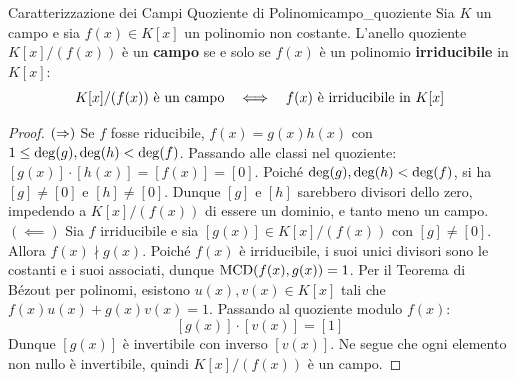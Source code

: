\begin{teorema}{Caratterizzazione dei Campi Quoziente di Polinomi}{campo_quoziente}
Sia $K$ un campo e sia $f(x) \in K[x]$ un polinomio non costante.
L'anello quoziente $K[x]/(f(x))$ è un \textbf{campo} se e solo se $f(x)$ è un polinomio \textbf{irriducibile} in $K[x]$:
\[
    K[x]/(f(x)) \text{ è un campo} \quad \Longleftrightarrow \quad f(x) \text{ è irriducibile in } K[x]
\]
\end{teorema}
\begin{proof}
$(\Rightarrow)$ Se $f$ fosse riducibile, $f(x) = g(x)h(x)$ con $1 \le \operatorname{deg}(g), \operatorname{deg}(h) < \operatorname{deg}(f)$.
Passando alle classi nel quoziente: $[g(x)] \cdot [h(x)] = [f(x)] = [0]$.
Poiché $\operatorname{deg}(g), \operatorname{deg}(h) < \operatorname{deg}(f)$, si ha $[g] \neq [0]$ e $[h] \neq [0]$.
Dunque $[g]$ e $[h]$ sarebbero divisori dello zero, impedendo a $K[x]/(f(x))$ di essere un dominio, e tanto meno un campo.
$(\impliedby)$ Sia $f$ irriducibile e sia $[g(x)] \in K[x]/(f(x))$ con $[g] \neq [0]$.
Allora $f(x) \nmid g(x)$. Poiché $f(x)$ è irriducibile, i suoi unici divisori sono le costanti e i suoi associati, dunque $\operatorname{MCD}(f(x), g(x)) = 1$.
Per il Teorema di Bézout per polinomi, esistono $u(x), v(x) \in K[x]$ tali che $f(x)u(x) + g(x)v(x) = 1$.
Passando al quoziente modulo $f(x)$:
\[
    [g(x)] \cdot [v(x)] = [1]
\]
Dunque $[g(x)]$ è invertibile con inverso $[v(x)]$. Ne segue che ogni elemento non nullo è invertibile, quindi $K[x]/(f(x))$ è un campo.
\end{proof}
